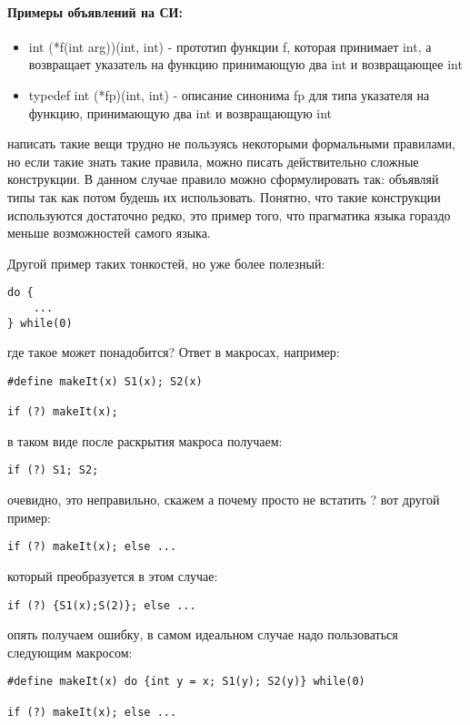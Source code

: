 \paragraph{Примеры объявлений на СИ:}

\begin{itemize}
\item int (*f(int arg))(int, int) - прототип функции f, которая принимает int, а возвращает указатель на функцию принимающую два int и возвращающее int

\item typedef int (*fp)(int, int) - описание синонима fp для типа указателя на функцию, принимающую два int и возвращающую int
\end{itemize}

написать такие вещи трудно не пользуясь некоторыми формальными правилами, но если такие знать такие правила, можно писать действительно сложные конструкции.
В данном случае правило можно сформулировать так: объявляй типы так как потом будешь их использовать. Понятно, что такие конструкции используются достаточно
редко, это пример того, что прагматика языка гораздо меньше возможностей самого языка.

Другой пример таких тонкостей, но уже более полезный:
\begin{lstlisting}
do {
	...
} while(0)
\end{lstlisting}
где такое может понадобится? Ответ в макросах, например:
\begin{lstlisting}
#define makeIt(x) S1(x); S2(x)

if (?) makeIt(x);
\end{lstlisting}
в таком виде после раскрытия макроса получаем:
\begin{lstlisting}
if (?) S1; S2;
\end{lstlisting}
очевидно, это неправильно, скажем а почему просто не встатить ${}$? вот другой пример:
\begin{lstlisting}
if (?) makeIt(x); else ...
\end{lstlisting}
который преобразуется в этом случае:
\begin{lstlisting}
if (?) {S1(x);S(2)}; else ...
\end{lstlisting}
опять получаем ошибку, в самом идеальном случае надо пользоваться следующим макросом:
\begin{lstlisting}
#define makeIt(x) do {int y = x; S1(y); S2(y)} while(0)

if (?) makeIt(x); else ...
\end{lstlisting}

